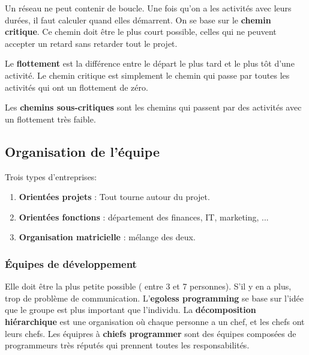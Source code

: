 Un réseau ne peut contenir de boucle.
Une fois qu’on a les activités avec leurs durées, il faut calculer quand elles démarrent.
On se base sur le \textbf{chemin critique}. Ce chemin doit être le plus court possible, celles qui ne peuvent accepter un retard sans retarder tout le projet.

Le \textbf{flottement} est la différence entre le départ le plus tard et le plus tôt d’une activité. Le chemin critique est simplement le chemin qui passe par toutes les activités qui ont un flottement de zéro.

Les \textbf{chemins sous-critiques} sont les chemins qui passent par des activités avec un flottement très faible.



\subsection{Organisation de l’équipe}
Trois types d’entreprises:
\begin{enumerate}
	\item \textbf{Orientées projets} : Tout tourne autour du projet.
	\item \textbf{Orientées fonctions} : département des finances, IT, marketing, ...
	\item \textbf{Organisation matricielle} : mélange des deux.
\end{enumerate}



\subsubsection{Équipes de développement}
Elle doit être la plus petite possible ( entre 3 et 7 personnes). S’il y en a plus, trop de problème de communication.
L’\textbf{egoless programming} se base sur l’idée que le groupe est plus important que l’individu.
La \textbf{décomposition hiérarchique} est une organisation où chaque personne a un chef, et les chefs ont leurs chefs.
Les équipres à \textbf{chiefs programmer} sont des équipes composées de programmeurs très réputés qui prennent toutes les responsabilités.